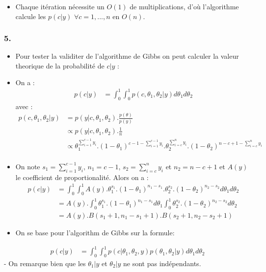 \documentclass[
]{article}
\providecommand{\tightlist}{%
  \setlength{\itemsep}{0pt}\setlength{\parskip}{0pt}}
\begin{document}
\begin{itemize}
\tightlist
\item
  Chaque itération nécessite un \(O(1)\) de multiplications, d'où
  l'algorithme calcule les \(p(c|y)\) \(\forall c=1,...,n\) en \(O(n)\).
\end{itemize}

\subsubsection{5.}\label{section-4}

\begin{itemize}
\item
  Pour tester la validiter de l'algorithme de Gibbs on peut calculer la
  valeur theorique de la probabilité de \(c|y\) :
\item
  On a : \[
  \begin{align}
  p(c|y) &= \int_0^1\int_0^1p(c,\theta_1, \theta_2|y)d\theta_1d\theta_2
  \end{align}
  \] avec : \[
  \begin{align}
  p(c,\theta_1, \theta_2|y) &= p(y|c,\theta_1, \theta_2).\frac{p(\theta)}{p(y)}\\
                  &\propto p(y|c,\theta_1, \theta_2).\frac1n \\
                  &\propto \theta_1^{\sum_{i=1}^{c-1} y_i}.(1-\theta_1)^{c-1-\sum_{i=1}^{c-1} y_i} . \theta_2^{\sum_{i=c}^n y_i}.(1-\theta_2)^{n-c+1-\sum_{i=c}^n y_i} \\
  \end{align}
  \]
\item
  On note \(s_1 = \sum_{i=1}^{c-1} y_i\), \(n_1 = c-1\),
  \(s_2 = \sum_{i=c}^n y_i\) et \(n_2 = n - c +1\) et \(A(y)\) le
  coefficient de proportionalité. Alors on a : \[
  \begin{align}
  p(c|y) &= \int_0^1\int_0^1A(y).\theta_1^{s_1}.(1-\theta_1)^{n_1 - s_1} . \theta_2^{s_2}.(1-\theta_2)^{n_2 - s_2}d\theta_1d\theta_2 \\
       &= A(y).\int_0^1 \theta_1^{s_1}.(1-\theta_1)^{n_1 - s_1}d\theta_1\int_0^1\theta_2^{s_2}.(1-\theta_2)^{n_2 - s_2}d\theta_2 \\
       &= A(y).B(s_1+1, n_1 - s_1 + 1).B(s_2 + 1, n_2 - s_2 + 1)
  \end{align}
  \]
\item
  On se base pour l'algorithm de Gibbs sur la formule:
\end{itemize}

\[
\begin{align}
p(c|y) &= \int_0^1\int_0^1p(c|\theta_1, \theta_2, y)p(\theta_1, \theta_2|y)d\theta_1d\theta_2
\end{align}
\] - On remarque bien que les \(\theta_1|y\) et \(\theta_2|y\) ne sont
pas indépendants.
\end{document}
